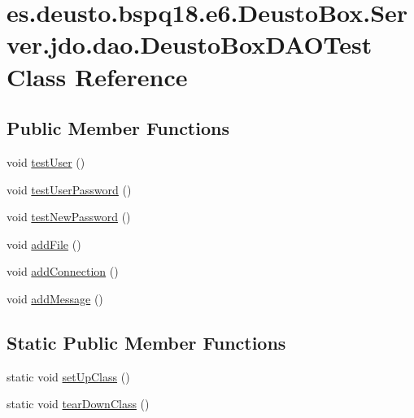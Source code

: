 \hypertarget{classes_1_1deusto_1_1bspq18_1_1e6_1_1_deusto_box_1_1_server_1_1jdo_1_1dao_1_1_deusto_box_d_a_o_test}{}\section{es.\+deusto.\+bspq18.\+e6.\+Deusto\+Box.\+Server.\+jdo.\+dao.\+Deusto\+Box\+D\+A\+O\+Test Class Reference}
\label{classes_1_1deusto_1_1bspq18_1_1e6_1_1_deusto_box_1_1_server_1_1jdo_1_1dao_1_1_deusto_box_d_a_o_test}
\subsection*{Public Member Functions}
\begin{DoxyCompactItemize}
\item 
void \mbox{\hyperlink{classes_1_1deusto_1_1bspq18_1_1e6_1_1_deusto_box_1_1_server_1_1jdo_1_1dao_1_1_deusto_box_d_a_o_test_a023ed2ee532ccf0956ba1cdbb88f4bdc}{test\+User}} ()
\item 
void \mbox{\hyperlink{classes_1_1deusto_1_1bspq18_1_1e6_1_1_deusto_box_1_1_server_1_1jdo_1_1dao_1_1_deusto_box_d_a_o_test_ada19de99001702fe02e0385a1c87cbd2}{test\+User\+Password}} ()
\item 
void \mbox{\hyperlink{classes_1_1deusto_1_1bspq18_1_1e6_1_1_deusto_box_1_1_server_1_1jdo_1_1dao_1_1_deusto_box_d_a_o_test_a5d988d2b6782c6786a1be73a59df0744}{test\+New\+Password}} ()
\item 
void \mbox{\hyperlink{classes_1_1deusto_1_1bspq18_1_1e6_1_1_deusto_box_1_1_server_1_1jdo_1_1dao_1_1_deusto_box_d_a_o_test_ad87f724f4bfa71ed2e9c603745e6ce8a}{add\+File}} ()
\item 
void \mbox{\hyperlink{classes_1_1deusto_1_1bspq18_1_1e6_1_1_deusto_box_1_1_server_1_1jdo_1_1dao_1_1_deusto_box_d_a_o_test_aa64a0acd6baac6e3ea53dba7c16d6c6d}{add\+Connection}} ()
\item 
void \mbox{\hyperlink{classes_1_1deusto_1_1bspq18_1_1e6_1_1_deusto_box_1_1_server_1_1jdo_1_1dao_1_1_deusto_box_d_a_o_test_a6fb096eeb6691d30e20dff8b2cc3f3f7}{add\+Message}} ()
\end{DoxyCompactItemize}
\subsection*{Static Public Member Functions}
\begin{DoxyCompactItemize}
\item 
static void \mbox{\hyperlink{classes_1_1deusto_1_1bspq18_1_1e6_1_1_deusto_box_1_1_server_1_1jdo_1_1dao_1_1_deusto_box_d_a_o_test_a44728d9c4cee578ad242e22a2a0885f8}{set\+Up\+Class}} ()
\item 
static void \mbox{\hyperlink{classes_1_1deusto_1_1bspq18_1_1e6_1_1_deusto_box_1_1_server_1_1jdo_1_1dao_1_1_deusto_box_d_a_o_test_acc567c2320ca41b2f8ec1f421837c505}{tear\+Down\+Class}} ()
\end{DoxyCompactItemize}
